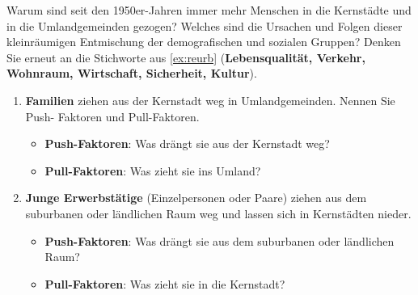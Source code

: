 \begin{myexercise}
Warum sind seit den 1950er-Jahren immer mehr Menschen in die Kernstädte und in die Umlandgemeinden gezogen? Welches sind die Ursachen und Folgen dieser kleinräumigen Entmischung der demografischen und sozialen Gruppen? Denken Sie erneut an die Stichworte aus \cref{ex:reurb} (\textbf{Lebensqualität, Verkehr, Wohnraum, Wirtschaft, Sicherheit, Kultur}).


\begin{enumerate}
\item \textbf{Familien} ziehen aus der Kernstadt weg in Umlandgemeinden. Nennen Sie Push- Faktoren und Pull-Faktoren.
\begin{itemize}
\item \textbf{Push-Faktoren}: Was drängt sie aus der Kernstadt weg?
\item \textbf{Pull-Faktoren}: Was zieht sie ins Umland?
\end{itemize}
\item \textbf{Junge Erwerbstätige} (Einzelpersonen oder Paare) ziehen aus dem suburbanen oder ländlichen Raum weg und lassen sich in Kernstädten nieder.
\begin{itemize}
\item \textbf{Push-Faktoren}: Was drängt sie aus dem suburbanen oder ländlichen Raum?
\item \textbf{Pull-Faktoren}: Was zieht sie in die Kernstadt?
\end{itemize}
\end{enumerate}


\end{myexercise}
